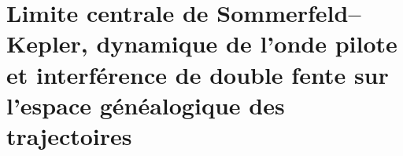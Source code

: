 \chapter{Limite centrale de Sommerfeld--Kepler, dynamique de l'onde pilote et interférence de double fente sur l'espace généalogique des trajectoires}
\label{chap:md-sommerfeld-piloto-rendija}
\begingroup
\let\HMTOwnerSection\section
\let\HMTOwnerSubsection\subsection
\let\HMTOwnerSubsubsection\subsubsection
\let\HMTOwnerParagraph\paragraph
\let\chapter\HMTOwnerSection
\let\section\HMTOwnerSubsection
\let\subsection\HMTOwnerSubsubsection
\let\subsubsection\HMTOwnerParagraph

\endgroup
\begingroup
\let\HMTOwnerSection\section
\let\HMTOwnerSubsection\subsection
\let\HMTOwnerSubsubsection\subsubsection
